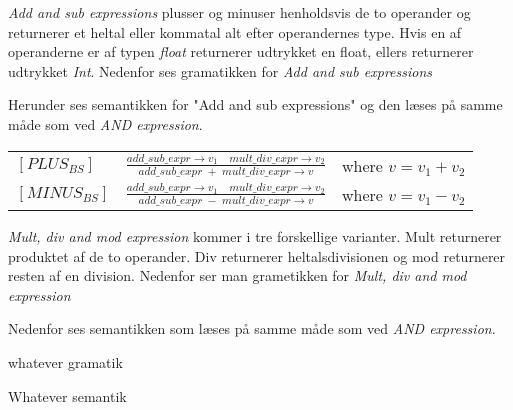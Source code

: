 \textit{Add and sub expressions} plusser og minuser henholdsvis de to operander og returnerer et heltal eller kommatal alt efter operandernes type. Hvis en af operanderne er af typen \textit{float} returnerer udtrykket en float, ellers returnerer udtrykket \textit{Int}. Nedenfor ses gramatikken for \textit{Add and sub expressions}

    
    \noindent Herunder ses semantikken for "Add and sub expressions" og den læses på samme måde som ved \textit{AND expression}.

\begin{semantik}
    \bgroup
    \def\arraystretch{3}
    \begin{table}[H]
    \centering
    \begin{tabular}{l c l}
        
        $[PLUS_{BS}]$ &$\frac{add\_sub\_expr \rightarrow v_1 \quad mult\_div\_expr \rightarrow v_2}{add\_sub\_expr\;+\;mult\_div\_expr \rightarrow v}$ & where $v = v_1 + v_2$ \\
        
        $[MINUS_{BS}]$ &$\frac{add\_sub\_expr \rightarrow v_1 \quad mult\_div\_expr \rightarrow v_2}{add\_sub\_expr\;-\;mult\_div\_expr \rightarrow v}$ & where $v = v_1 - v_2$ \\
        
    \end{tabular}
    \end{table}
    \egroup
    \caption{Add and sub expression}
    \label{sem:addSubExpr}
\end{semantik}

\textit{Mult, div and mod expression} kommer i tre forskellige varianter. Mult returnerer produktet af de to operander. Div returnerer heltalsdivisionen og mod returnerer resten af en division. Nedenfor ser man grametikken for \textit{Mult, div and mod expression}


Nedenfor ses semantikken som læses på samme måde som ved \textit{AND expression}.



whatever gramatik
    

Whatever semantik

